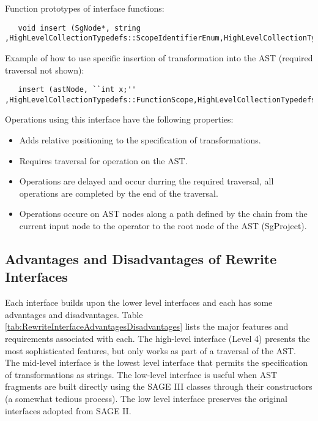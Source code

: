Function prototypes of interface functions:
{\indent
{\mySmallFontSize
\begin{verbatim}
   void insert (SgNode*, string ,HighLevelCollectionTypedefs::ScopeIdentifierEnum,HighLevelCollectionTypedefs::PlacementPositionEnum);
\end{verbatim}
}}
Example of how to use specific insertion of transformation into the AST (required traversal not shown):
{\indent
{\mySmallFontSize
\begin{verbatim}
   insert (astNode, ``int x;'' ,HighLevelCollectionTypedefs::FunctionScope,HighLevelCollectionTypedefs::TopOfScope);
\end{verbatim}
}}
Operations using this interface have the following properties:
\begin{itemize}
   \item Adds relative positioning to the specification of transformations.
   \item Requires traversal for operation on the AST.
   \item Operations are delayed and occur durring the required traversal, all operations
    are completed by the end of the traversal.
   \item Operations occure on AST nodes along a path defined by the chain from the current
    input node to the operator to the root node of the AST (SgProject).
\end{itemize}



\subsection{Advantages and Disadvantages of Rewrite Interfaces}

   Each interface builds upon the lower level interfaces and each 
has some advantages and disadvantages. Table 
\ref{tab:RewriteInterfaceAdvantagesDisadvantages} lists the
major features and requirements associated with each.  The
high-level interface (Level 4) presents the most sophisticated 
features, but only works as part of a traversal of the AST.  The 
mid-level interface is the lowest level interface that permits 
the specification of transformations as strings.  The low-level interface
is useful when AST fragments are built directly using the SAGE III
classes through their constructors (a somewhat tedious process).
The low level interface preserves the original interfaces adopted 
from SAGE II.

